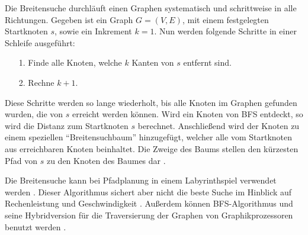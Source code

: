 Die Breitensuche durchläuft einen Graphen systematisch und schrittweise in alle Richtungen. Gegeben ist ein Graph $G = (V, E)$, mit einem festgelegten Startknoten $s$, sowie ein Inkrement $k=1$. Nun werden folgende Schritte in einer Schleife ausgeführt:
\begin{itemize}
\item[1.] Finde alle Knoten, welche $k$ Kanten von $s$ entfernt sind.
\item[2.] Rechne $k + 1$.
\end{itemize}
Diese Schritte werden so lange wiederholt, bis alle Knoten im Graphen gefunden wurden, die von $s$ erreicht werden können. Wird ein Knoten von BFS entdeckt, so wird die Distanz zum Startknoten $s$ berechnet. Anschließend wird der Knoten zu einem speziellen ``Breitensuchbaum'' hinzugefügt, welcher alle vom Startknoten aus erreichbaren Knoten beinhaltet. Die Zweige des Baums stellen den kürzesten Pfad von $s$ zu den Knoten des Baumes dar \cite[S.594]{Cormen.2009}.

Die Breitensuche kann bei Pfadplanung in einem Labyrinthspiel verwendet werden \cite[S. 3ff.]{PBAS18}. Dieser Algorithmus sichert aber nicht die beste Suche im Hinblick auf Rechenleistung und Geschwindigkeit \cite[S. 6]{PBAS18}. Außerdem können BFS-Algorithmus und seine Hybridversion \cite{HT13} für die Traversierung der Graphen von Graphikprozessoren benutzt werden \cite{MGG12}.

